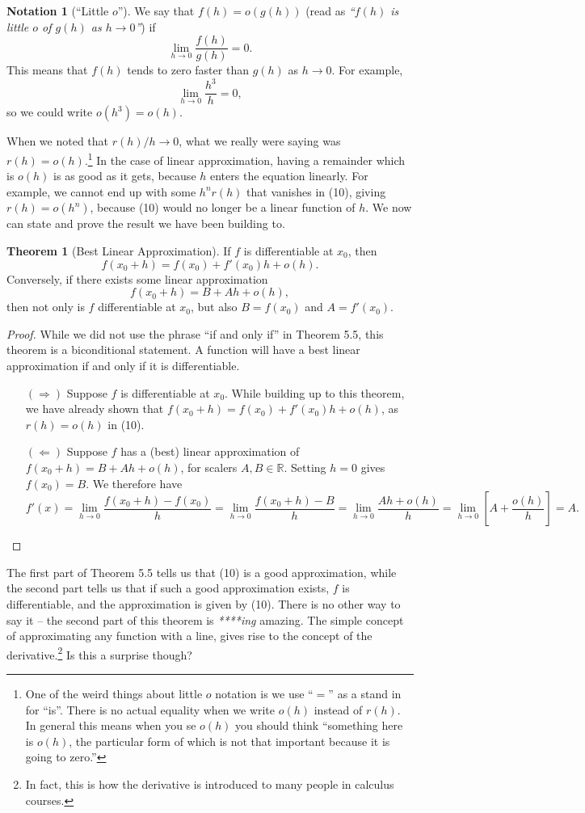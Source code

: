 \documentclass{article}
\newcommand{\R}{\mathbb{R}}
\theoremstyle{definition}
\newtheorem{theorem}{Theorem}[section]
\newtheorem{note}{Notation}[section]
\begin{document}
\begin{note}[``Little $ o $'']
We say that $ f(h)=o(g(h)) $ (read as \textit{\color{red}``$ f(h) $ is little $ o $ of $ g(h) $ as $ h\to 0 $''}) if $$ \lim\limits_{h\to 0} \frac{f(h)}{g(h)}=0.$$ This means that $ f(h) $ tends to zero faster than $ g(h) $ as $ h\to 0 $. For example, $$\lim\limits_{h\to 0}\frac{h^3}{h}=0 ,$$ so we could write $ o(h^3)=o(h) $.   
\end{note}
When we noted that $ r(h)/h\to 0 $, what we really were saying was $ r(h)=o(h) $.\footnote{One of the weird things about little $ o $ notation is we use ``$ = $'' as a stand in for ``is''. There is no actual equality when we write $ o(h) $ instead of $ r(h) $. In general this means when you se $ o(h) $ you should think ``something here is $ o(h) $, the particular form of which is not that important because it is going to zero.''} In the case of linear approximation, having a remainder which is $ o(h) $ is as good as it gets, because $ h $ enters the equation linearly. For example, we cannot end up with some $ h^nr(h) $ that vanishes in (10), giving $ r(h)=o(h^n) $, because (10) would no longer be a linear function of $ h $. We now can state and prove the result we have been building to.  
\begin{theorem}[Best Linear Approximation]
	If $ f $ is differentiable at $ x_0 $, then $$f(x_0+h)=f(x_0)+f'(x_0)h+o(h) .$$ Conversely, if there exists some linear approximation $$ f(x_0+h)=B+Ah+o(h) ,$$ then not only is $ f $ differentiable at $ x_0 $, but also $ B=f(x_0) $ and $ A=f'(x_0) $. 
\end{theorem}
\begin{proof}
	While we did not use the phrase ``if and only if'' in Theorem 5.5, this theorem is a biconditional statement. A function will have a best linear approximation if and only if it is differentiable.
	\begin{enumerate}
		\item [$ (\Longrightarrow) $] Suppose $ f $ is differentiable at $ x_0 $. While building up to this theorem, we have already shown that $ f(x_0+h)=f(x_0)+f'(x_0)h+o(h) $, as $ r(h)=o(h) $ in (10).
		\item [$ (\Longleftarrow) $] Suppose $ f $ has a (best) linear approximation of $ f(x_0+h)=B+Ah+o(h)$, for scalers $ A,B\in\R $. Setting $ h=0 $ gives $f(x_0)=B $. We therefore have  $$f'(x)=\lim_{h\to0}\frac{f(x_0+h)-f(x_0)}{h}=\lim_{h\to0}\frac{f(x_0+h)-B}{h}=\lim_{h\to0}\frac{Ah+o(h)}{h}=\lim_{h\to0}\left[A+\frac{o(h)}{h}\right]=A .$$ 
	\end{enumerate}

\end{proof}
The first part of Theorem 5.5 tells us that (10) is a good approximation, while the second part tells us that if such a good approximation exists, $ f $ is differentiable, and the approximation is given by (10). There is no other way to say it -- the second part of this theorem is \textit{****ing} amazing. The simple concept of approximating any function with a line, gives rise to the concept of the derivative.\footnote{In fact, this is how the derivative is introduced to many people in calculus courses.} Is this a surprise though? 
\end{document}
